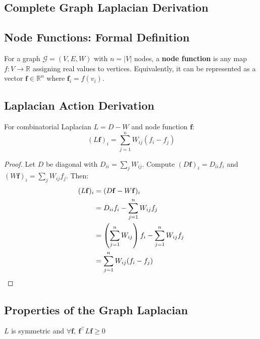 \begin{notechapter}
\section{Complete Graph Laplacian Derivation}

\subsection{Node Functions: Formal Definition}
\begin{definition}
For a graph $\mathcal{G}=(V,E,W)$ with $n=|V|$ nodes, a \textbf{node function} 
is any map $f: V \to \mathbb{R}$ assigning real values to vertices. 
Equivalently, it can be represented as a vector $\mathbf{f} \in \mathbb{R}^n$ 
where $\mathbf{f}_i = f(v_i)$.
\end{definition}

\subsection{Laplacian Action Derivation}
\begin{theorem}
For combinatorial Laplacian $L = D - W$ and node function $\mathbf{f}$:
\[
(L\mathbf{f})_i = \sum_{j=1}^n W_{ij}(f_i - f_j)
\]
\end{theorem}

\begin{proof}
Let $D$ be diagonal with $D_{ii} = \sum_j W_{ij}$. Compute $(D\mathbf{f})_i = 
D_{ii}f_i$ and $(W\mathbf{f})_i = \sum_j W_{ij}f_j$. Then:
\begin{align*}
(L\mathbf{f})_i 
    &= (D\mathbf{f} - W\mathbf{f})_i \\
    &= D_{ii}f_i - \sum_{j=1}^n W_{ij}f_j \\
    &= \left(\sum_{j=1}^n W_{ij}\right)f_i - \sum_{j=1}^n W_{ij}f_j \\
    &= \sum_{j=1}^n W_{ij}(f_i - f_j) \quad \qedhere
\end{align*}
\end{proof}

\subsection{Properties of the Graph Laplacian}
\begin{theorem}
$L$ is symmetric and $\forall \mathbf{f},\ \mathbf{f}^\top L\mathbf{f} \geq 0$
\end{theorem}


\end{notechapter}
